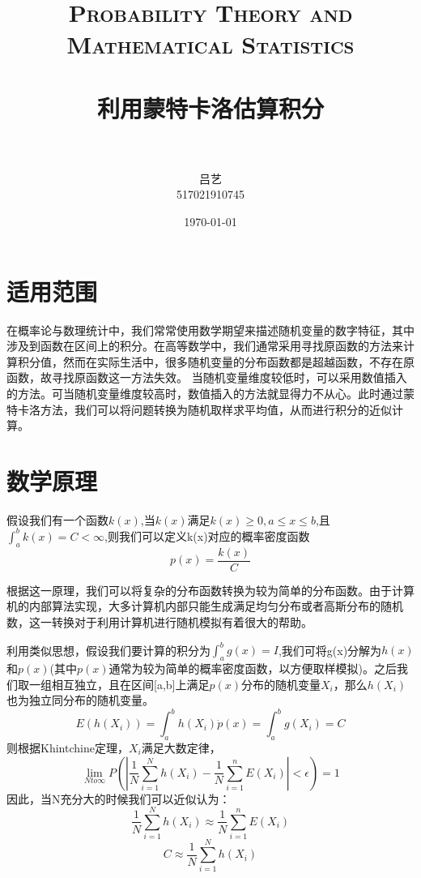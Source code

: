 \documentclass[paper=a4, fontsize=11pt]{scrartcl} %
\title{	
\normalfont \normalsize 
\textsc{Probability Theory and Mathematical Statistics} \\ [25pt] %
\horrule{1pt} \\[0.5cm] %
\huge \kaishu 利用蒙特卡洛估算积分 \\ %
\horrule{2pt} \\[0.5cm] %
}
\author{\kaishu 吕艺\\ \normalsize 517021910745} %
\date{\normalsize\today} %
\numberwithin{equation}{section} %
\numberwithin{figure}{section} %
\numberwithin{table}{section} %
\begin{document}
\maketitle %
\section{\kaishu 适用范围}
在概率论与数理统计中，我们常常使用数学期望来描述随机变量的数字特征，其中涉及到函数在区间上的积分。在高等数学中，我们通常采用寻找原函数的方法来计算积分值，然而在实际生活中，很多随机变量的分布函数都是超越函数，不存在原函数，故寻找原函数这一方法失效。
当随机变量维度较低时，可以采用数值插入的方法。可当随机变量维度较高时，数值插入的方法就显得力不从心。此时通过蒙特卡洛方法，我们可以将问题转换为随机取样求平均值，从而进行积分的近似计算。
\section{\kaishu 数学原理}
假设我们有一个函数$k(x)$,当$k(x)$满足$k(x) \ge 0 , a \leq x \leq b$,且$\int _a^b k(x) = C <\infty$,则我们可以定义k(x)对应的概率密度函数
\begin{equation}
p(x) = \frac{k(x)}{C}
\end{equation}

根据这一原理，我们可以将复杂的分布函数转换为较为简单的分布函数。由于计算机的内部算法实现，大多计算机内部只能生成满足均匀分布或者高斯分布的随机数，这一转换对于利用计算机进行随机模拟有着很大的帮助。
\vspace{2cm}


利用类似思想，假设我们要计算的积分为$\int_a^b g(x) = I$,我们可将g(x)分解为$h(x)$和$p(x)$(其中$p(x)$通常为较为简单的概率密度函数，以方便取样模拟)。之后我们取一组相互独立，且在区间[a,b]上满足$p(x)$分布的随机变量$X_{i}$，那么$h(X_{i})$也为独立同分布的随机变量。
\begin{equation}	
E(h(X_{i})) = \int_a^b{h(X_{i}) \dot p(x)} =\int_a^b{g(X_{i})} = C
\end{equation}
则根据Khintchine定理，$X_{i}$满足大数定律，
\begin{equation}
	\lim_{N to \infty} P(| \dfrac{1}{N} \sum_{i=1}^{N} h(X_{i}) - \dfrac{1}{N}\sum_{i = 1}^{n}E(X_{i})|<\epsilon)=1
\end{equation}
因此，当N充分大的时候我们可以近似认为：
\begin{equation}
	\dfrac{1}{N} \sum_{i=1}^{N} h(X_{i}) \approx \dfrac{1}{N}\sum_{i = 1}^{n}E(X_{i})
\end{equation}
\begin{equation}
	C \approx \dfrac{1}{N} \sum_{i=1}^{N} h(X_{i})
\end{equation}
\end{document}
